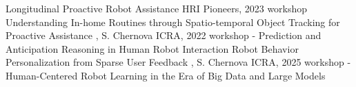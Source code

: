 
\begin{cvpubs}

  \cvpub
    {Longitudinal Proactive Robot Assistance} %
    {} %
    {HRI Pioneers, 2023 workshop} %
    {\bullet} %
  \cvpub
    {Understanding In-home Routines through Spatio-temporal Object Tracking for Proactive Assistance} %
    {, S. Chernova} %
    {ICRA, 2022 workshop - Prediction and Anticipation Reasoning in Human Robot Interaction} %
    {\bullet} %
\cvpub
    {Robot Behavior Personalization from Sparse User Feedback} %
    {, S. Chernova} %
    {ICRA, 2025 workshop - Human-Centered Robot Learning in the Era of Big Data and Large Models} %
    {\bullet}
\end{cvpubs}
